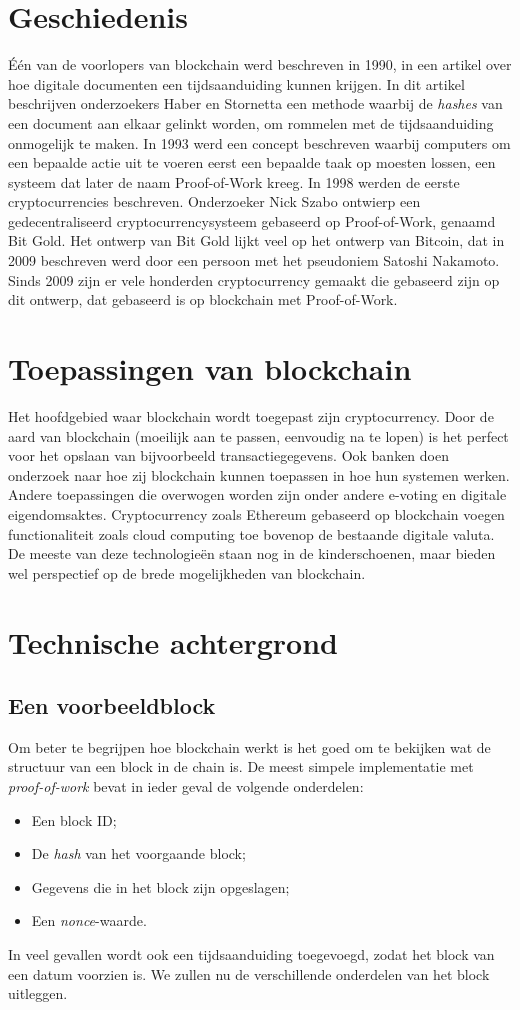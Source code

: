 \documentclass{article}
\begin{document}
\section{Geschiedenis}
Één van de voorlopers van blockchain werd beschreven in 1990, in een artikel over hoe digitale documenten een tijdsaanduiding kunnen krijgen. In dit artikel beschrijven onderzoekers Haber en Stornetta een methode waarbij de \textit{hashes} van een document aan elkaar gelinkt worden, om rommelen met de tijdsaanduiding onmogelijk te maken. In 1993 werd een concept beschreven waarbij computers om een bepaalde actie uit te voeren eerst een bepaalde taak op moesten lossen, een systeem dat later de naam Proof-of-Work kreeg. In 1998 werden de eerste cryptocurrencies beschreven. Onderzoeker Nick Szabo ontwierp een gedecentraliseerd cryptocurrencysysteem gebaseerd op Proof-of-Work, genaamd Bit Gold. Het ontwerp van Bit Gold lijkt veel op het ontwerp van Bitcoin, dat in 2009 beschreven werd door een persoon met het pseudoniem Satoshi Nakamoto. Sinds 2009 zijn er vele honderden cryptocurrency gemaakt die gebaseerd zijn op dit ontwerp, dat gebaseerd is op blockchain met Proof-of-Work.

\section{Toepassingen van blockchain}
Het hoofdgebied waar blockchain wordt toegepast zijn cryptocurrency. Door de aard van blockchain (moeilijk aan te passen, eenvoudig na te lopen) is het perfect voor het opslaan van bijvoorbeeld transactiegegevens. Ook banken doen onderzoek naar hoe zij blockchain kunnen toepassen in hoe hun systemen werken. Andere toepassingen die overwogen worden zijn onder andere e-voting en digitale eigendomsaktes. Cryptocurrency zoals Ethereum gebaseerd op blockchain voegen functionaliteit zoals cloud computing toe bovenop de bestaande digitale valuta. De meeste van deze technologieën staan nog in de kinderschoenen, maar bieden wel perspectief op de brede mogelijkheden van blockchain.	
\section{Technische achtergrond}
\subsection{Een voorbeeldblock}
Om beter te begrijpen hoe blockchain werkt is het goed om te bekijken wat de structuur van een block in de chain is. De meest simpele implementatie met \textit{proof-of-work} bevat in ieder geval de volgende onderdelen:
\begin{itemize}
\item Een block ID;
\item De \textit{hash} van het voorgaande block;
\item Gegevens die in het block zijn opgeslagen;
\item Een \textit{nonce}-waarde.
\end{itemize}
In veel gevallen wordt ook een tijdsaanduiding toegevoegd, zodat het block van een datum voorzien is. We zullen nu de verschillende onderdelen van het block uitleggen.
\end{document}
